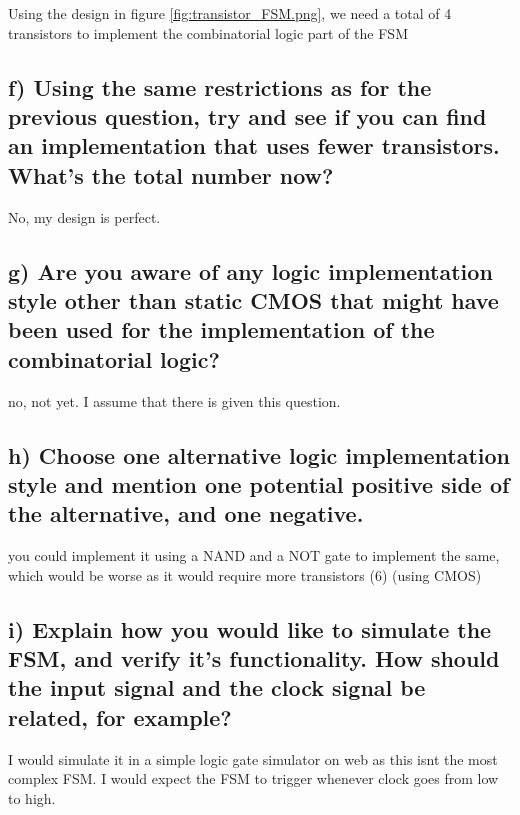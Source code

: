 Using the design in figure \ref*{fig:transistor_FSM.png}, we need a total of 4 transistors to implement the combinatorial logic part of the FSM

\subsection*{f) Using the same restrictions as for the previous question, try and see if you can find an implementation that uses fewer transistors. What's the total number now?}

No, my design is perfect.

\subsection*{g) Are you aware of any logic implementation style other than static CMOS that might have been used for the implementation of the combinatorial logic?}

no, not yet. I assume that there is given this question.

\subsection*{h) Choose one alternative logic implementation style and mention one potential positive side of the alternative, and one negative.}

you could implement it using a NAND and a NOT gate to implement the same, which would be worse as it would require more transistors (6) (using CMOS)
\subsection*{i) Explain how you would like to simulate the FSM, and verify it's functionality. How should the input signal and the clock signal be related, for example?}

I would simulate it in a simple logic gate simulator on web as this isnt the most complex FSM. I would expect the FSM to trigger whenever clock goes from low to high.